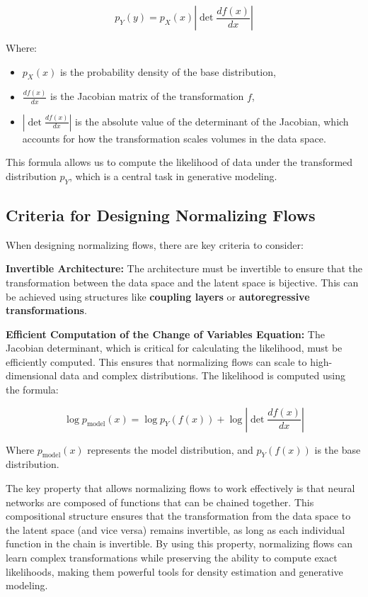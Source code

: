 \documentclass{article}
\begin{document}
\[
p_Y(y) = p_X(x) \left| \det \frac{d f(x)}{dx} \right|
\]

Where:
\begin{itemize}
    \item \( p_X(x) \) is the probability density of the base distribution,
    \item \( \frac{d f(x)}{dx} \) is the Jacobian matrix of the transformation \( f \),
    \item \( \left| \det \frac{d f(x)}{dx} \right| \) is the absolute value of the determinant of the Jacobian, which accounts for how the transformation scales volumes in the data space.
\end{itemize}

This formula allows us to compute the likelihood of data under the transformed distribution \( p_Y \), which is a central task in generative modeling.

\subsection{Criteria for Designing Normalizing Flows}
When designing normalizing flows, there are key criteria to consider:


\textbf{Invertible Architecture:} The architecture must be invertible to ensure that the transformation between the data space and the latent space is bijective. This can be achieved using structures like \textbf{coupling layers} or \textbf{autoregressive transformations}.

\textbf{Efficient Computation of the Change of Variables Equation:} The Jacobian determinant, which is critical for calculating the likelihood, must be efficiently computed. This ensures that normalizing flows can scale to high-dimensional data and complex distributions. The likelihood is computed using the formula:

\[
\log p_{\text{model}}(x) = \log p_Y(f(x)) + \log \left| \det \frac{d f(x)}{dx} \right|
\]

Where \( p_{\text{model}}(x) \) represents the model distribution, and \( p_Y(f(x)) \) is the base distribution.

The key property that allows normalizing flows to work effectively is that neural networks are composed of functions that can be chained together. This compositional structure ensures that the transformation from the data space to the latent space (and vice versa) remains invertible, as long as each individual function in the chain is invertible. By using this property, normalizing flows can learn complex transformations while preserving the ability to compute exact likelihoods, making them powerful tools for density estimation and generative modeling.
\end{document}
